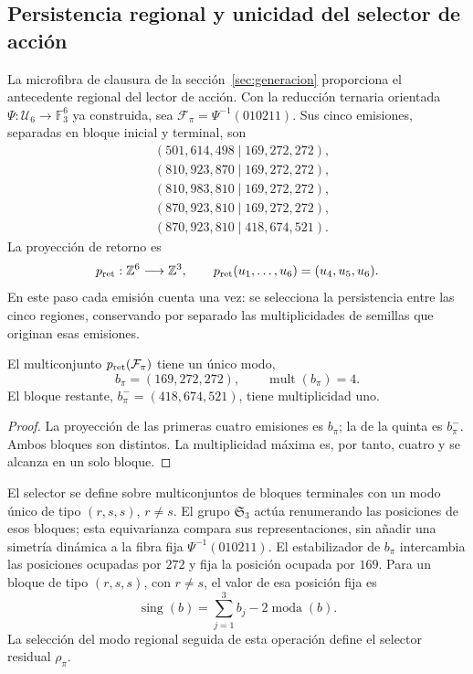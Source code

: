 \subsection{Persistencia regional y unicidad del selector de acción}
\label{sec:accion-selector-regional}

La microfibra de clausura de la sección~\ref{sec:generacion} proporciona
el antecedente regional del lector de acción. Con la reducción ternaria orientada
\(\Psi:\mathcal U_6\to\mathbb F_3^6\) ya construida, sea
\(\mathcal F_\pi=\Psi^{-1}(010211)\). Sus cinco emisiones, separadas
en bloque inicial y terminal, son
\[
\begin{aligned}
 &(501,614,498\mid169,272,272),\\
 &(810,923,870\mid169,272,272),\\
 &(810,983,810\mid169,272,272),\\
 &(870,923,810\mid169,272,272),\\
 &(870,923,810\mid418,674,521).
\end{aligned}
\]
La proyección de retorno es
\[
 p_{\rm ret}:\mathbb Z^6\longrightarrow\mathbb Z^3,
 \qquad p_{\rm ret}(u_1,\ldots,u_6)=(u_4,u_5,u_6).
\]
En este paso cada emisión cuenta una vez: se selecciona la persistencia
entre las cinco regiones, conservando por separado las multiplicidades
de semillas que originan esas emisiones.

\begin{proposition}
\label{prop:accion-bloque-persistente}
El multiconjunto \(p_{\rm ret}(\mathcal F_\pi)\) tiene un único modo,
\[
 b_\pi=(169,272,272),\qquad \operatorname{mult}(b_\pi)=4.
\]
El bloque restante, \(b_\pi^-=(418,674,521)\), tiene multiplicidad uno.
\end{proposition}
\begin{proof}
La proyección de las primeras cuatro emisiones es \(b_\pi\); la de la
quinta es \(b_\pi^-\). Ambos bloques son distintos. La multiplicidad
máxima es, por tanto, cuatro y se alcanza en un solo bloque.
\end{proof}

El selector se define sobre multiconjuntos de bloques terminales con un
modo único de tipo \((r,s,s)\), \(r\ne s\). El grupo
\(\mathfrak S_3\) actúa renumerando las posiciones de esos bloques;
esta equivarianza compara sus representaciones, sin añadir una simetría
dinámica a la fibra fija \(\Psi^{-1}(010211)\).
El estabilizador de \(b_\pi\) intercambia las posiciones ocupadas por
\(272\) y fija la posición ocupada por \(169\). Para un bloque de tipo
\((r,s,s)\), con \(r\ne s\), el valor de esa posición fija es
\[
 \operatorname{sing}(b)=\sum_{j=1}^3 b_j-2\operatorname{moda}(b).
\]
La selección del modo regional seguida de esta operación define el
selector residual \(\rho_\pi\).

